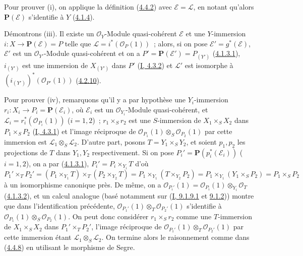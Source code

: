 
Pour prouver (i), on applique la définition
(\hyperref[II.4.4.2-fr]{4.4.2}) avec $\mathcal{E}=\mathcal{L}$, en notant
qu'alors $\mathbf{P}(\mathcal{E})$ s'identifie à $Y$
(\hyperref[II.4.1.4-fr]{4.1.4}).

Démontrons (iii). Il existe un $\mathcal{O}_Y$-Module quasi-cohérent
$\mathcal{E}$ et une $Y$-immersion $i:X\to\mathbf{P}(\mathcal{E})=P$ telle
que $\mathcal{L}=i^*(\mathcal{O}_P(1))$~; alors, si on pose
$\mathcal{E}'=g^*(\mathcal{E})$, $\mathcal{E}'$ est un
$\mathcal{O}_{Y'}$-Module quasi-cohérent et on a
$P'=\mathbf{P}(\mathcal{E}')=P_{(Y')}$
(\hyperref[II.4.1.3.1-fr]{4.1.3.1}), $i_{(Y')}$ est une immersion de
$X_{(Y')}$ dans $P'$ (\hyperref[I.4.3.2-fr]{I, 4.3.2}) et $\mathcal{L}'$ est
isomorphe à $(i_{(Y')})^*(\mathcal{O}_{P'}(1))$
(\hyperref[II.4.2.10-fr]{4.2.10}).

Pour prouver (iv), remarquons qu'il y a par hypothèse une $Y_i$-immersion
$r_i:X_i\to P_i=\mathbf{P}(\mathcal{E}_i)$, où $\mathcal{E}_i$ est un
$\mathcal{O}_{Y_i}$-Module quasi-cohérent, et
$\mathcal{L}_i=r_i^*(\mathcal{O}_{P_i}(1))$ ($i=1,2$)~;
$r_1\times_Sr_2$ est une $S$-immersion de $X_1\times_SX_2$ dans
$P_1\times_SP_2$ (\hyperref[I.4.3.1-fr]{I, 4.3.1}) et l'image réciproque de
$\mathcal{O}_{P_1}(1)\otimes_S\mathcal{O}_{P_2}(1)$ par cette immersion est
$\mathcal{L}_1\otimes_S\mathcal{L}_2$. D'autre part, posons
$T=Y_1\times_SY_2$, et soient $p_1,p_2$ les projections de $T$ dans $Y_1,Y_2$
respectivement. Si on pose
$P_i'=\mathbf{P}(p_i^*(\mathcal{E}_i))$ ($i=1,2$), on a par
(\hyperref[II.4.1.3.1-fr]{4.1.3.1}), $P_i'=P_i\times_{Y_i}T$ d'où
\[
  P_1'\times_TP_2'
  =(P_1\times_{Y_1}T)\times_T(P_2\times_{Y_2}T)
  =P_1\times_{Y_1}(T\times_{Y_2}P_2)
  =P_1\times_{Y_1}(Y_1\times_SP_2)
  =P_1\times_SP_2
\]
à un isomorphisme canonique près. De même, on a
$\mathcal{O}_{P_i'}(1)=\mathcal{O}_{P_i}(1)\otimes_{Y_i}\mathcal{O}_T$
(\hyperref[II.4.1.3.2-fr]{4.1.3.2}), et un calcul analogue (basé notamment
sur (\hyperref[I.9.1.9.1-fr]{I, 9.1.9.1} et
\hyperref[I.9.1.2-fr]{9.1.2})) montre que dans l'identification précédente,
$\mathcal{O}_{P_1'}(1)\otimes_T\mathcal{O}_{P_2'}(1)$ s'identifie à
$\mathcal{O}_{P_1}(1)\otimes_S\mathcal{O}_{P_2}(1)$. On peut donc considérer
$r_1\times_Sr_2$ comme une $T$-immersion de $X_1\times_SX_2$ dans
$P_1'\times_TP_2'$, l'image réciproque de
$\mathcal{O}_{P_1'}(1)\otimes_T\mathcal{O}_{P_2'}(1)$ par cette immersion
étant $\mathcal{L}_1\otimes_S\mathcal{L}_2$. On termine alors le raisonnement
comme dans (\hyperref[II.4.4.8-fr]{4.4.8}) en utilisant le morphisme de Segre.


